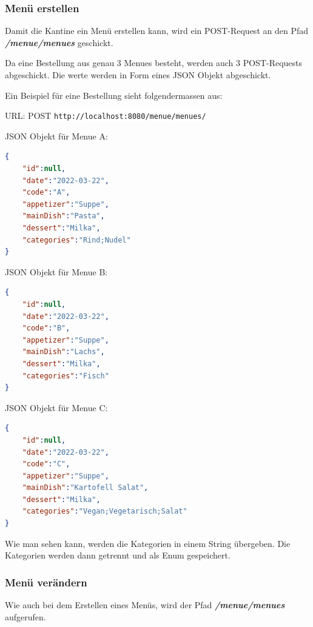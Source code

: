 \subsubsection{Menü erstellen}

Damit die Kantine ein Menü erstellen kann, wird ein POST-Request an den Pfad \textbf{\textit{/menue/menues}} geschickt.

Da eine Bestellung aus genau 3 Menues besteht, werden auch 3 POST-Requests abgeschickt. Die werte werden in Form eines JSON Objekt abgeschickt.

Ein Beispiel für eine Bestellung sieht folgendermassen aus:

URL: POST \colorbox{white}{\lstinline[basicstyle=\ttfamily\color{black},language=html]|http://localhost:8080/menue/menues/|}


JSON Objekt für Menue A:

\begin{lstlisting}[language=json,firstnumber=1]
{
    "id":null,
    "date":"2022-03-22",
    "code":"A",
    "appetizer":"Suppe",
    "mainDish":"Pasta",
    "dessert":"Milka",
    "categories":"Rind;Nudel"
}
\end{lstlisting}

JSON Objekt für Menue B:

\begin{lstlisting}[language=json,firstnumber=1]
{
    "id":null,
    "date":"2022-03-22",
    "code":"B",
    "appetizer":"Suppe",
    "mainDish":"Lachs",
    "dessert":"Milka",
    "categories":"Fisch"
}
\end{lstlisting}

JSON Objekt für Menue C:

\begin{lstlisting}[language=json,firstnumber=1]
{
    "id":null,
    "date":"2022-03-22",
    "code":"C",
    "appetizer":"Suppe",
    "mainDish":"Kartofell Salat",
    "dessert":"Milka",
    "categories":"Vegan;Vegetarisch;Salat"
}
\end{lstlisting}

Wie man sehen kann, werden die Kategorien in einem String übergeben. Die Kategorien werden dann getrennt und als Enum gespeichert.

\subsubsection{Menü verändern}

Wie auch bei dem Erstellen eines Menüs, wird der Pfad \textbf{\textit{/menue/menues}} aufgerufen. 

